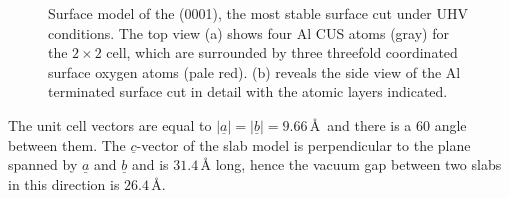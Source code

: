 \documentclass[11pt,DIV=13,BCOR=5mm,a4paper,headinclude]{scrbook}
\renewcommand{\vec}[1]{\underline{#1}}
\begin{document}
\begin{figure}[!ht]
 \centering
{}
 \quad\quad
 \caption{Surface model of the (0001), the most stable surface cut under UHV conditions.
The top view (a) shows four Al CUS atoms (gray) for the $2\times 2$ cell, which are surrounded by three threefold coordinated surface oxygen atoms (pale red).
(b) reveals the side view of the Al terminated surface cut in detail with the atomic layers indicated.}
        \label{abb:surf_0001}
\end{figure}
The unit cell vectors are equal to $|\vec{a}|=|\vec{b}|=9.66\,$\AA  ~and there is a $60$\textdegree{} angle between them.
The $\vec{c}$-vector of the slab model is perpendicular to the plane spanned by $\vec{a}$ and $\vec{b}$ and is $31.4\,$\AA{} long, hence the vacuum gap between two slabs in this direction is $26.4\,$\AA.
\end{document}
